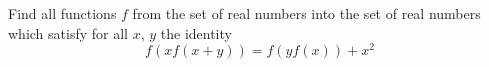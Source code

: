 Find all functions $f$ from the set of real numbers into the set of real numbers which satisfy for all $x$,  $y$ the identity \[ f\left(xf(x+y)\right) = f\left(yf(x)\right) +x^2\]